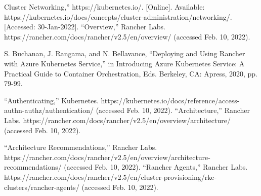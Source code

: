 \documentclass[12pt,oneside]{report}
\begin{document}
\begin{thebibliography}{10}
     Cluster Networking,” https://kubernetes.io/. [Online]. 
    Available: https://kubernetes.io/docs/concepts/cluster-administration/networking/.[Accessed: 30-Jan-2022].
    “Overview,” Rancher Labs. https://rancher.com/docs/rancher/v2.5/en/overview/ (accessed Feb. 10, 2022).
    
    S. Buchanan, J. Rangama, and N. Bellavance, 
    “Deploying and Using Rancher with Azure Kubernetes Service,” in Introducing Azure Kubernetes Service: A Practical Guide to Container Orchestration, Eds. Berkeley, CA: Apress, 2020, pp. 79-99.

    “Authenticating,” Kubernetes. https://kubernetes.io/docs/reference/access-authn-authz/authentication/ (accessed Feb. 10, 2022).
    “Architecture,” Rancher Labs. https://rancher.com/docs/rancher/v2.5/en/overview/architecture/ (accessed Feb. 10, 2022).

    “Architecture Recommendations,” Rancher Labs. https://rancher.com/docs/rancher/v2.5/en/overview/architecture-recommendations/ (accessed Feb. 10, 2022).
    “Rancher Agents,” Rancher Labs. https://rancher.com/docs/rancher/v2.5/en/cluster-provisioning/rke-clusters/rancher-agents/ (accessed Feb. 10, 2022).
 

  \end{thebibliography}
  \newpage
  
  \listoffigures
  \newpage

  \listoftables
  \newpage

  
\end{document}
